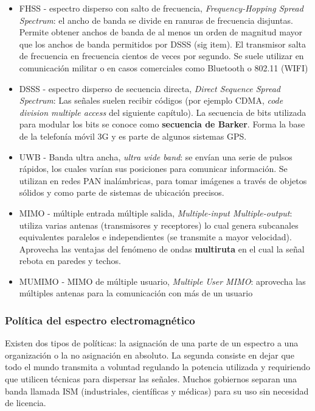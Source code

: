 \documentclass{book}
\begin{document}
	\begin{itemize}
		\item FHSS - espectro disperso con salto de frecuencia, \textit{Frequency-Hopping Spread Spectrum}: el ancho de banda se divide en ranuras de frecuencia disjuntas. Permite obtener anchos de banda de al menos un orden de magnitud mayor que los anchos de banda permitidos por DSSS (sig item). El transmisor salta de frecuencia en frecuencia cientos de veces por segundo. Se suele utilizar en comunicación militar o en casos comerciales como Bluetooth o 802.11 (WIFI)
		
		\item DSSS - espectro disperso de secuencia directa, \textit{Direct Sequence Spread Spectrum}: Las señales suelen recibir códigos (por ejemplo CDMA, \textit{code division multiple access} del siguiente capítulo). La secuencia de bits utilizada para modular los bits se conoce como \textbf{secuencia de Barker}. Forma la base de la telefonía móvil 3G y es parte de algunos sistemas GPS.
		
		\item UWB - Banda ultra ancha, \textit{ultra wide band}: se envían una serie de pulsos rápidos, los cuales varían sus posiciones para comunicar información. Se utilizan en redes PAN inalámbricas, para tomar imágenes a través de objetos sólidos y como parte de sistemas de ubicación precisos.
		
		\item MIMO - múltiple entrada múltiple salida, \textit{Multiple-input Multiple-output}: utiliza varias antenas (transmisores y receptores) lo cual genera subcanales equivalentes paralelos e independientes (se transmite a mayor velocidad). Aprovecha las ventajas del fenómeno de ondas \textbf{multiruta} en el cual la señal rebota en paredes y techos.
		
		\item MUMIMO - MIMO de múltiple usuario, \textit{Multiple User MIMO}: aprovecha las múltiples antenas para la comunicación con más de un usuario
		
	\end{itemize}
	
	\subsubsection{Política del espectro electromagnético}
	Existen dos tipos de políticas: la asignación de una parte de un espectro a una organización o la no asignación en absoluto. La segunda consiste en dejar que todo el mundo transmita a voluntad regulando la potencia utilizada y requiriendo que utilicen técnicas para dispersar las señales. Muchos gobiernos separan una banda llamada ISM (industriales, científicas y médicas) para su uso sin necesidad de licencia.
	
\end{document}
